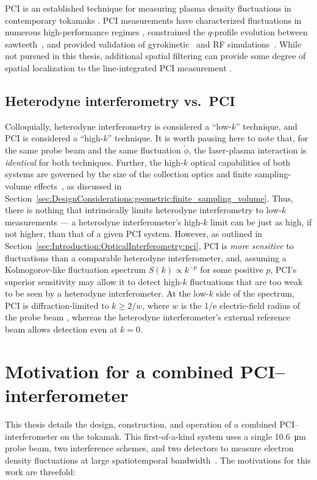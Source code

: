 PCI is an established technique for measuring plasma density fluctuations
in contemporary tokamaks
\cite{coda_phd, mazurenko_phd, marinoni_phd}.
PCI measurements have
characterized fluctuations in numerous high-performance regimes
\cite{coda_LH_transition,coda_ELMs,rost_pp14,marinoni_nf15,mazurenko_prl02},
constrained the $q$-profile evolution between sawteeth~\cite{edlund_prl09}, and
provided validation of gyrokinetic~\cite{lin_pp09,rost_pp10,ennever_pp15}
and RF simulations~\cite{tsujii_pp15}.
While not pursued in this thesis,
additional spatial filtering can provide
some degree of spatial localization
to the line-integrated PCI measurement
\cite{dorris_rsi09, lin_rsi06}.


\subsection{Heterodyne interferometry vs.\ PCI}
Colloquially, heterodyne interferometry
is considered a ``low-$k$'' technique, and
PCI is considered a ``high-$k$'' technique.
It is worth pausing here to note that,
for the same probe beam and the same fluctuation $\tilde{\phi}$,
the laser-plasma interaction is \emph{identical} for both techniques.
Further, the high-$k$ optical capabilities of both systems
are governed by the size of the collection optics
and finite sampling-volume effects~\cite{bravenec_rsi95}, as discussed in
Section~\ref{sec:DesignConsiderations:geometric:finite_sampling_volume}.
Thus, there is nothing that intrinsically limits
heterodyne interferometry to low-$k$ measurements ---
a heterodyne interferometer's high-$k$ limit
can be just as high, if not higher,
than that of a given PCI system.
However, as outlined in
Section~\ref{sec:Introduction:OpticalInterferometry:pci},
PCI is \emph{more sensitive} to fluctuations
than a comparable heterodyne interferometer, and,
assuming a Kolmogorov-like fluctuation spectrum
$S(k) \propto k^{-p}$ for some positive $p$,
PCI's superior sensitivity may allow it
to detect high-$k$ fluctuations
that are too weak to be seen by a heterodyne interferometer.
At the low-$k$ side of the spectrum,
PCI is diffraction-limited to $k \geq 2 / w$,
where $w$ is the 1/e electric-field radius of the probe beam
\cite{dorris_rsi09},
whereas the heterodyne interferometer's external reference beam
allows detection even at $k = 0$.


\section{Motivation for a combined PCI--interferometer}
This thesis details the design, construction, and operation
of a combined PCI--interferometer on the \diiid\space tokamak.
This first-of-a-kind system uses
a single \SI{10.6}{\micro \meter} probe beam,
two interference schemes, and
two detectors
to measure electron density fluctuations
at large spatiotemporal bandwidth~\cite{davis_rsi16}.
The motivations for this work are threefold:

